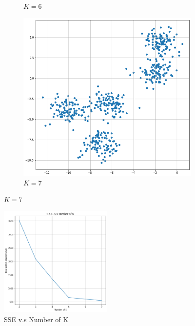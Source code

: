 \documentclass[12pt]{article}
\begin{document}
\begin{enumerate}
\begin{figure}[!h]
\begin{subfigure}[e]{0.25\textwidth}
         \caption{$K=6$}
         \label{fig:K6}
     \end{subfigure}
     \begin{subfigure}[f]{0.25\textwidth}
         \centering
         \includegraphics[width=\textwidth]{fig/hw2_q1.png}
         \caption{$K=7$}
         \label{fig:K7}
     \end{subfigure}
        \label{fig:three graphs}
\end{figure}

\begin{figure}[!h]
    \centering
    \includegraphics[width=0.5\textwidth]{fig/hw2_q1_a.png}
    \caption{SSE v.s Number of K}
    \label{fig:my_label}
\end{figure}


\end{enumerate}
\end{document}
